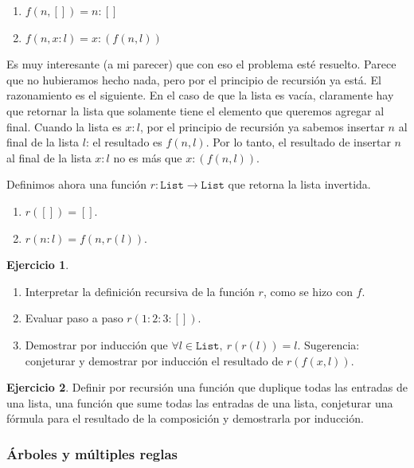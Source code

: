 \documentclass[a4paper, 12pt]{report}
\theoremstyle{definition}
\newtheorem{ejercicio}{Ejercicio}[section]
\begin{document}
\begin{enumerate}
	\item $f(n,[]) = n:[]$
	\item $f(n,x:l) = x:(f(n,l))$
\end{enumerate}
Es muy interesante (a mi parecer) que con eso el problema esté resuelto. Parece que no hubieramos hecho nada, pero por el principio de recursión ya está. El razonamiento es el siguiente. En el caso de que la lista es vacía, claramente hay que retornar la lista que solamente tiene el elemento que queremos agregar al final. Cuando la lista es $x:l$, por el principio de recursión ya sabemos insertar $n$ al final de la lista $l$: el  resultado es $f(n,l)$. Por lo tanto, el resultado de insertar $n$ al final de la lista $x:l$ no es más que $x:(f(n,l))$.

Definimos ahora una función $r:\mathtt{List}\to\mathtt{List}$ que retorna la lista invertida.
\begin{enumerate}
	\item $r([]) = []$.
	\item $r(n:l) = f(n,r(l))$.
\end{enumerate}

\begin{ejercicio}
	\begin{enumerate}
		\item Interpretar la definición recursiva de la función $r$, como se hizo con $f$.
		\item Evaluar paso a paso $r(1:2:3:[])$.
		\item Demostrar por inducción que $\forall l\in\mathtt{List},~r(r(l))=l$. Sugerencia: conjeturar y demostrar por inducción el resultado de $r(f(x,l))$.
	\end{enumerate}
\end{ejercicio}
\begin{ejercicio}
	Definir por recursión  una función que duplique todas las entradas de una lista, una función que sume todas las entradas de una lista, conjeturar una fórmula para el resultado de la composición y demostrarla por inducción.
\end{ejercicio}

\subsubsection{Árboles y múltiples reglas}
\end{document}
